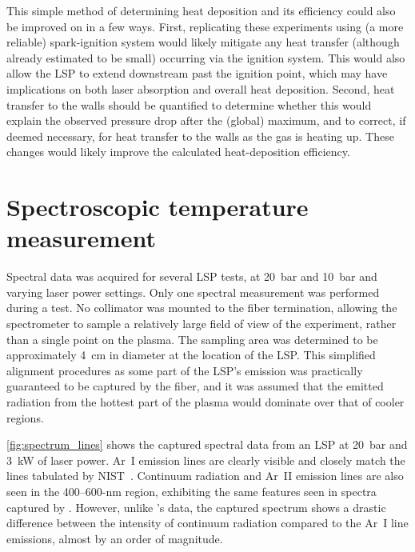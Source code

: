             This simple method of determining heat deposition and its efficiency could also be improved on in a few ways. First, replicating these experiments using (a more reliable) spark-ignition system would likely mitigate any heat transfer (although already estimated to be small) occurring via the ignition system. This would also allow the LSP to extend downstream past the ignition point, which may have implications on both laser absorption and overall heat deposition. Second, heat transfer to the walls should be quantified to determine whether this would explain the observed pressure drop after the (global) maximum, and to correct, if deemed necessary, for heat transfer to the walls as the gas is heating up. These changes would likely improve the calculated heat-deposition efficiency.
    \newpage
    \section{Spectroscopic temperature measurement} \label{sec:results_spectroscopy}
        Spectral data was acquired for several LSP tests, at \qty{20}{bar} and \qty{10}{bar} and varying laser power settings. Only one spectral measurement was performed during a test. No collimator was mounted to the fiber termination, allowing the spectrometer to sample a relatively large field of view of the experiment, rather than a single point on the plasma. The sampling area was determined to be approximately \qty{4}{cm} in diameter at the location of the LSP. This simplified alignment procedures as some part of the LSP's emission was practically guaranteed to be captured by the fiber, and it was assumed that the emitted radiation from the hottest part of the plasma would dominate over that of cooler regions.

        \autoref{fig:spectrum_lines} shows the captured spectral data from an LSP at \qty{20}{bar} and \qty{3}{kW} of laser power. Ar~I emission lines are clearly visible and closely match the lines tabulated by NIST~\cite{kramidaNISTAtomicSpectra2022}. Continuum radiation and Ar~II emission lines are also seen in the 400--600-nm region, exhibiting the same features seen in spectra captured by \textcite{luCharacteristicDiagnosticsLaserStabilized2022}. However, unlike \citeauthor{luCharacteristicDiagnosticsLaserStabilized2022}'s data, the captured spectrum shows a drastic difference between the intensity of continuum radiation compared to the Ar~I line emissions, almost by an order of magnitude. 

